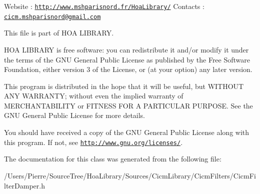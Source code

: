 Website \-: \href{http://www.mshparisnord.fr/HoaLibrary/}{\tt http\-://www.\-mshparisnord.\-fr/\-Hoa\-Library/} Contacts \-: \href{mailto:cicm.mshparisnord@gmail.com}{\tt cicm.\-mshparisnord@gmail.\-com}

This file is part of H\-O\-A L\-I\-B\-R\-A\-R\-Y.

H\-O\-A L\-I\-B\-R\-A\-R\-Y is free software\-: you can redistribute it and/or modify it under the terms of the G\-N\-U General Public License as published by the Free Software Foundation, either version 3 of the License, or (at your option) any later version.

This program is distributed in the hope that it will be useful, but W\-I\-T\-H\-O\-U\-T A\-N\-Y W\-A\-R\-R\-A\-N\-T\-Y; without even the implied warranty of M\-E\-R\-C\-H\-A\-N\-T\-A\-B\-I\-L\-I\-T\-Y or F\-I\-T\-N\-E\-S\-S F\-O\-R A P\-A\-R\-T\-I\-C\-U\-L\-A\-R P\-U\-R\-P\-O\-S\-E. See the G\-N\-U General Public License for more details.

You should have received a copy of the G\-N\-U General Public License along with this program. If not, see \href{http://www.gnu.org/licenses/}{\tt http\-://www.\-gnu.\-org/licenses/}. 

The documentation for this class was generated from the following file\-:\begin{DoxyCompactItemize}
\item 
/\-Users/\-Pierre/\-Source\-Tree/\-Hoa\-Library/\-Sources/\-Cicm\-Library/\-Cicm\-Filters/Cicm\-Filter\-Damper.\-h\end{DoxyCompactItemize}
